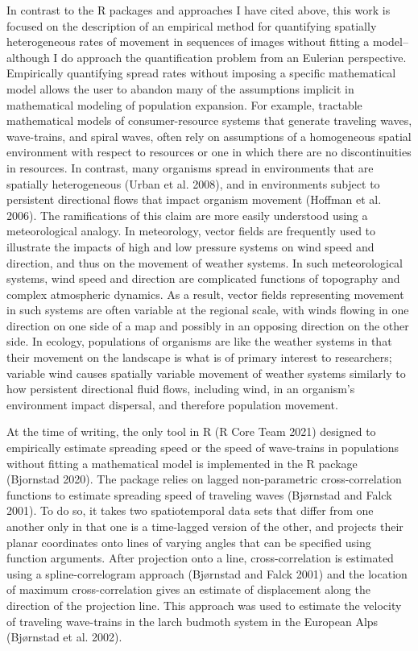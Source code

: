 In contrast to the R packages and approaches I have cited above, this work is focused on the description of an empirical method for quantifying spatially heterogeneous rates of movement in sequences of images without fitting a model--although I do approach the quantification problem from an Eulerian perspective. Empirically quantifying spread rates without imposing a specific mathematical model allows the user to abandon many of the assumptions implicit in mathematical modeling of population expansion. For example, tractable mathematical models of consumer-resource systems that generate traveling waves, wave-trains, and spiral waves, often rely on assumptions of a homogeneous spatial environment with respect to resources or one in which there are no discontinuities in resources. In contrast, many organisms spread in environments that are spatially heterogeneous (Urban et al. 2008), and in environments subject to persistent directional flows that impact organism movement (Hoffman et al. 2006). The ramifications of this claim are more easily understood using a meteorological analogy. In meteorology, vector fields are frequently used to illustrate the impacts of high and low pressure systems on wind speed and direction, and thus on the movement of weather systems. In such meteorological systems, wind speed and direction are complicated functions of topography and complex atmospheric dynamics. As a result, vector fields representing movement in such systems are often variable at the regional scale, with winds flowing in one direction on one side of a map and possibly in an opposing direction on the other side. In ecology, populations of organisms are like the weather systems in that their movement on the landscape is what is of primary interest to researchers; variable wind causes spatially variable movement of weather systems similarly to how persistent directional fluid flows, including wind, in an organism's environment impact dispersal, and therefore population movement.

At the time of writing, the only tool in R (R Core Team 2021) designed to empirically estimate spreading speed or the speed of wave-trains in populations without fitting a mathematical model is implemented in the  R package (Bjornstad 2020). The  package relies on lagged non-parametric cross-correlation functions to estimate spreading speed of traveling waves (Bjørnstad and Falck 2001). To do so, it takes two spatiotemporal data sets that differ from one another only in that one is a time-lagged version of the other, and projects their planar coordinates onto lines of varying angles that can be specified using function arguments. After projection onto a line, cross-correlation is estimated using a spline-correlogram approach (Bjørnstad and Falck 2001) and the location of maximum cross-correlation gives an estimate of displacement along the direction of the projection line. This approach was used to estimate the velocity of traveling wave-trains in the larch budmoth system in the European Alps (Bjørnstad et al. 2002).


